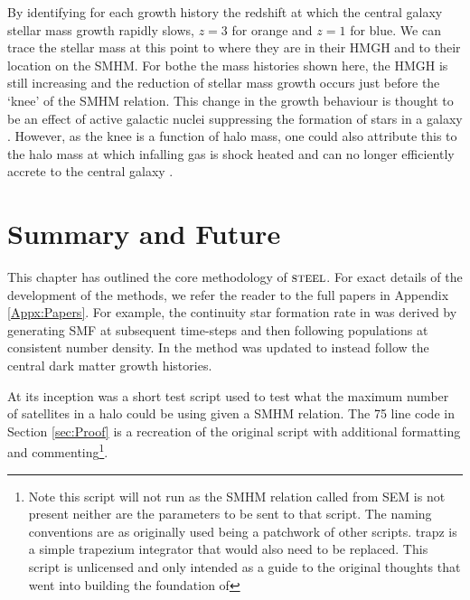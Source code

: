 By identifying for each growth history the redshift at which the central galaxy stellar mass growth rapidly slows, $z = 3$ for orange and $z = 1$ for blue. We can trace the stellar mass at this point to where they are in their HMGH and to their location on the SMHM. For bothe the mass histories shown here, the HMGH is still increasing and the reduction of stellar mass growth occurs just before the `knee' of the SMHM relation. This change in the growth behaviour is thought to be an effect of active galactic nuclei suppressing the formation of stars in a galaxy \cite[e.g.][]{Cattaneo2006ModellingMass, Barai2018QuasarGalaxies}. However, as the knee is a function of halo mass, one could also attribute this to the halo mass at which infalling gas is shock heated and can no longer efficiently accrete to the central galaxy \cite[e.g.][]{Cattaneo2006ModellingMass, Behroozi2013ONEFFICIENCY}.

\section{Summary and Future}

This chapter has outlined the core methodology of $\textsc{steel}$. For exact details of the development of the methods, we refer the reader to the full papers in Appendix \ref{Appx:Papers}. For example, the continuity star formation rate in  was derived by generating SMF at subsequent time-steps and then following populations at consistent number density. In  the method was updated to instead follow the central dark matter growth histories. 

At its inception \steel was a short test script used to test what the maximum number of satellites in a halo could be using given a SMHM relation. The 75 line code in Section \ref{sec:Proof} is a recreation of the original script with additional formatting and commenting\footnote{Note this script will not run as the SMHM relation called from SEM is not present neither are the parameters to be sent to that script. The naming conventions are as originally used being a patchwork of other scripts. trapz is a simple trapezium integrator that would also need to be replaced. This script is unlicensed and only intended as a guide to the original thoughts that went into building the foundation of \steel}.

